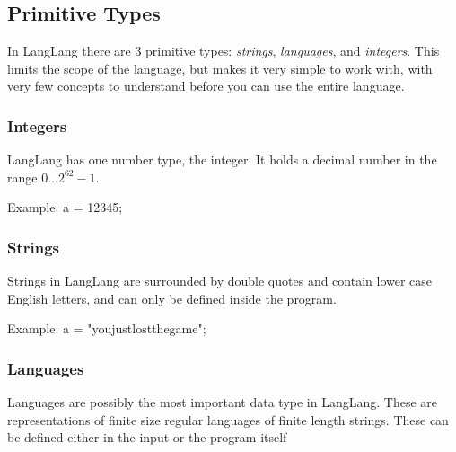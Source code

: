 \subsection{Primitive Types}
\begin{normalsize}
In LangLang there are 3 primitive types: \textit{strings}, \textit{languages}, and \textit{integers}. This limits the scope of the language, but makes it very simple to work with, with very few concepts to understand before you can use the entire language.
\end{normalsize}
\subsubsection{Integers}
\begin{normalsize}
LangLang has one number type, the integer. It holds a decimal number in the range $ 0 ... 2^{62}-1 $.

Example:
a = 12345;
\end{normalsize}
\subsubsection{Strings}
\begin{normalsize}
Strings in LangLang are surrounded by double quotes and contain lower case English letters, and can only be defined inside the program.

Example:
a = "youjustlostthegame";

\end{normalsize}
\subsubsection{Languages}
\begin{normalsize}
Languages are possibly the most important data type in LangLang. These are representations of finite size regular languages of finite length strings. These can be defined either in the input or the program itself
\end{normalsize}